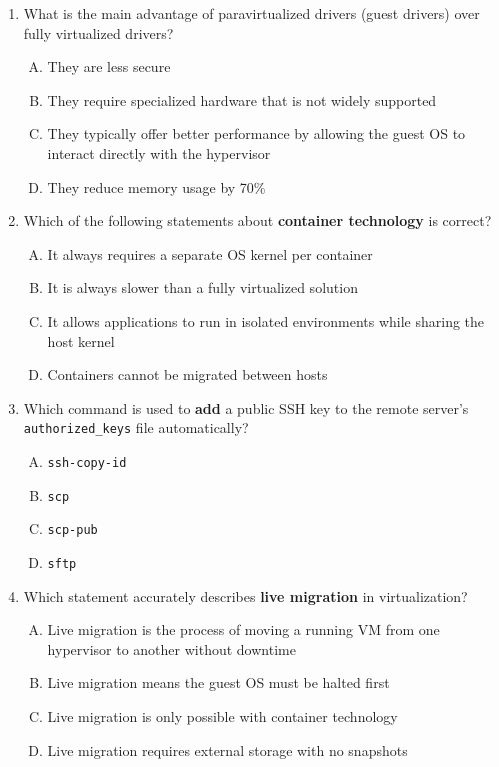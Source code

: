 \documentclass[a4paper]{report}
\begin{document}
\begin{enumerate}[1.]
    \item What is the main advantage of paravirtualized drivers (guest drivers) over fully virtualized drivers?  
    \begin{enumerate}[A)]
        \item They are less secure  
        \item They require specialized hardware that is not widely supported  
        \item They typically offer better performance by allowing the guest OS to interact directly with the hypervisor  
        \item They reduce memory usage by 70\%  
    \end{enumerate}

    \item Which of the following statements about \textbf{container technology} is correct?  
    \begin{enumerate}[A)]
        \item It always requires a separate OS kernel per container  
        \item It is always slower than a fully virtualized solution  
        \item It allows applications to run in isolated environments while sharing the host kernel  
        \item Containers cannot be migrated between hosts  
    \end{enumerate}

    \item Which command is used to \textbf{add} a public SSH key to the remote server’s \texttt{authorized\_keys} file automatically?  
    \begin{enumerate}[A)]
        \item \texttt{ssh-copy-id}  
        \item \texttt{scp}  
        \item \texttt{scp-pub}  
        \item \texttt{sftp}  
    \end{enumerate}

    \item Which statement accurately describes \textbf{live migration} in virtualization?  
    \begin{enumerate}[A)]
        \item Live migration is the process of moving a running VM from one hypervisor to another without downtime  
        \item Live migration means the guest OS must be halted first  
        \item Live migration is only possible with container technology  
        \item Live migration requires external storage with no snapshots  
    \end{enumerate}

\end{enumerate}
\end{document}

